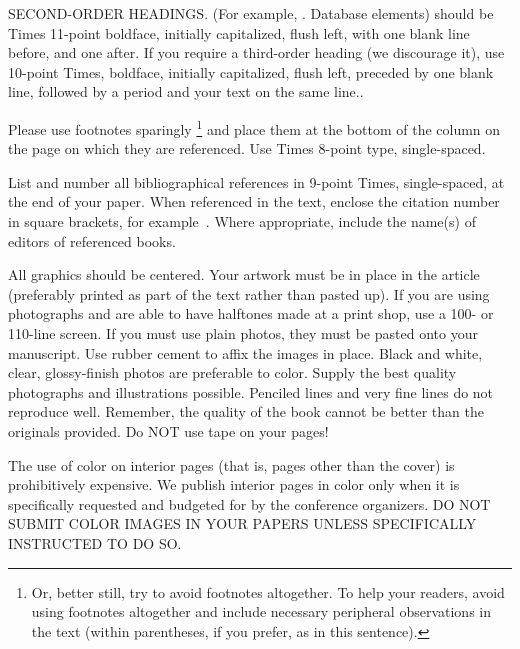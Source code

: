 \documentclass[times, 10pt,twocolumn]{article}
\begin{document}
SECOND-ORDER HEADINGS. (For example, {. Database elements}) 
should be Times 11-point boldface, initially capitalized, flush left, 
with one blank line before, and one after. If you require a third-order 
heading (we discourage it), use 10-point Times, boldface, initially 
capitalized, flush left, preceded by one blank line, followed by a period 
and your text on the same line..


Please use footnotes sparingly%
\footnote
   {%
     Or, better still, try to avoid footnotes altogether.  To help your 
     readers, avoid using footnotes altogether and include necessary 
     peripheral observations in the text (within parentheses, if you 
     prefer, as in this sentence).
   }
and place them at the bottom of the column on the page on which they are 
referenced. Use Times 8-point type, single-spaced.



List and number all bibliographical references in 9-point Times, 
single-spaced, at the end of your paper. When referenced in the text, 
enclose the citation number in square brackets, for example~\cite{ex1}. 
Where appropriate, include the name(s) of editors of referenced books.


All graphics should be centered. Your artwork must be in place in the 
article (preferably printed as part of the text rather than pasted up). 
If you are using photographs and are able to have halftones made at a 
print shop, use a 100- or 110-line screen. If you must use plain photos, 
they must be pasted onto your manuscript. Use rubber cement to affix the 
images in place. Black and white, clear, glossy-finish photos are 
preferable to color. Supply the best quality photographs and 
illustrations possible. Penciled lines and very fine lines do not 
reproduce well. Remember, the quality of the book cannot be better than 
the originals provided. Do NOT use tape on your pages!


The use of color on interior pages (that is, pages other
than the cover) is prohibitively expensive. We publish interior pages in 
color only when it is specifically requested and budgeted for by the 
conference organizers. DO NOT SUBMIT COLOR IMAGES IN YOUR 
PAPERS UNLESS SPECIFICALLY INSTRUCTED TO DO SO.
\end{document}
